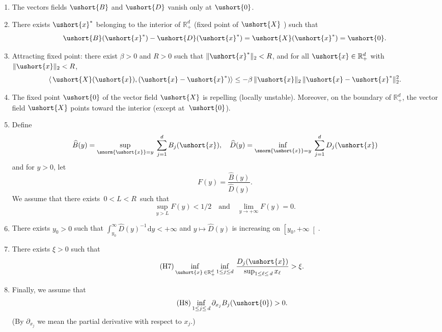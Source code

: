 \documentclass[10pt]{amsart}
\newcommand{\scaleto}[2]{#1}
\numberwithin{equation}{section}
\theoremstyle{plain}
\theoremstyle{definition}
\newcommand{\rpd}{\mathbb{R}_+^d}
\newcommand{\srpd}{\mathbb{R}_+^d}
\newcommand{\vecxf}{\ushort{x}^*}
\newcommand{\vecx}{\ushort{x}}
\newcommand{\vecX}{\ushort{X}}
\newcommand{\vecB}{\ushort{B}}
\newcommand{\vecD}{\ushort{D}}
\newcommand{\veczer}{\ushort{0}}
\newcommand{\dd}{\hspace{1pt}\mathrm{d}}
\newcommand{\normdeux}[1]{\|#1\|_{2}}\let\snormdeux\normdeux
\begin{document}
\bgroup{}
\begin{enumerate}
\item \label{H1} The vectors fields $\vecB$ and $\vecD$ vanish only at $\ushort{0}$.
\item \label{H2} There exists $\vecxf$ belonging to the interior of $\rpd$ \textup{(}fixed point of $\vecX$
\textup{)} such that
\[
\vecB(\vecxf)-\vecD(\vecxf)=\vecX(\vecxf)=\ushort{0}.
\]
\item\label{H3} Attracting fixed point: there exist $\beta>0$ and $R>0$ such that $\normdeux{\vecxf}<R$, and for all $\vecx\in \rpd$ with $\normdeux{\vecx}<R$,
\begin{equation}\label{Xalpha}
\langle\, \vecX(\vecx), (\vecx-\vecxf)\rangle \le -\beta\, \normdeux{\vecx}\, \|\vecx-\vecxf\|_{2}^2.
\end{equation}
\item\label{H4} The fixed point $\ushort{0}$ of the vector field $\vecX$ is repelling (locally unstable).
Moreover, on the boundary of $\rpd$, the vector field $\vecX$ points toward the interior (except at~$\veczer$).
\item\label{H5} Define
\[
\widehat{B}(y)=\sup_{\snorm{\vecx}=y}\;\sum_{j=1}^{d}B_{j}(\vecx),\quad \widehat{D}(y)=
\inf_{\snorm{\vecx}=y}\;\sum_{j=1}^{d}D_{j}(\vecx)
\]
and for $y>0$, let
\[
F(y)= \frac{\widehat{B}(y)}{\widehat{D}(y)}.
\]
We assume that there exists $\,0<L<R\,$ such that
\[
\sup_{y>L} F(y)<\scaleto{1/2}{10pt}\quad\text{and}\quad \lim_{y\to+\infty} F(y)=0.
\]

\item\label{H6} There exists $y_{0}>0$ such that $\int_{y_{0}}^{\infty} \widehat{D}(y)^{-1}\dd y<+\infty$ and $y\mapsto \widehat{D}(y)$ is
increasing on $\left[y_{0},+\infty\right[$.
\item
There exists $\xi>0$ such that
\begin{equation}
\label{cond:mort}
\tag{H7}
\inf_{\vecx\,\in \srpd} \inf_{1\leq j\leq d}\, \frac{D_{j}(\vecx)}{\sup_{1\leq \ell\leq \,d} x_{\ell}} >\xi.
\end{equation}
\item
Finally, we assume that
\begin{equation}\label{cond:nais}\tag{H8}
\inf_{1\leq j\leq \, d}\partial_{x_{j}} B_{j}(\veczer) > 0.
\end{equation}
(By $\partial_{x_{j}}$ we mean the partial derivative with respect to $x_{j}$.)
\end{enumerate}
\egroup
\end{document}
